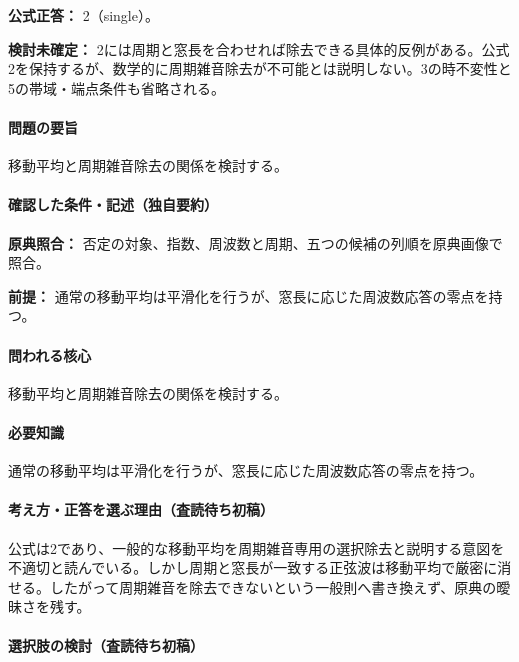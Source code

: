 \textbf{公式正答：} 2（single）。

\par\textbf{検討未確定：} 2には周期と窓長を合わせれば除去できる具体的反例がある。公式2を保持するが、数学的に周期雑音除去が不可能とは説明しない。3の時不変性と5の帯域・端点条件も省略される。

\paragraph{問題の要旨} 移動平均と周期雑音除去の関係を検討する。

\paragraph{確認した条件・記述（独自要約）}\mbox{}\par

\noindent\textbf{原典照合：} 否定の対象、指数、周波数と周期、五つの候補の列順を原典画像で照合。\par

\noindent\textbf{前提：} 通常の移動平均は平滑化を行うが、窓長に応じた周波数応答の零点を持つ。\par

\paragraph{問われる核心} 移動平均と周期雑音除去の関係を検討する。

\paragraph{必要知識} 通常の移動平均は平滑化を行うが、窓長に応じた周波数応答の零点を持つ。

\paragraph{考え方・正答を選ぶ理由（査読待ち初稿）} 公式は2であり、一般的な移動平均を周期雑音専用の選択除去と説明する意図を不適切と読んでいる。しかし周期と窓長が一致する正弦波は移動平均で厳密に消せる。したがって周期雑音を除去できないという一般則へ書き換えず、原典の曖昧さを残す。

\paragraph{選択肢の検討（査読待ち初稿）}\mbox{}\par

